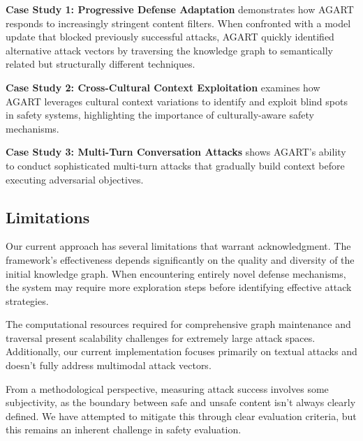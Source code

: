 \textbf{Case Study 1: Progressive Defense Adaptation} demonstrates how AGART responds to increasingly stringent content filters. When confronted with a model update that blocked previously successful attacks, AGART quickly identified alternative attack vectors by traversing the knowledge graph to semantically related but structurally different techniques.

\textbf{Case Study 2: Cross-Cultural Context Exploitation} examines how AGART leverages cultural context variations to identify and exploit blind spots in safety systems, highlighting the importance of culturally-aware safety mechanisms.

\textbf{Case Study 3: Multi-Turn Conversation Attacks} shows AGART's ability to conduct sophisticated multi-turn attacks that gradually build context before executing adversarial objectives.

\subsection{Limitations}
Our current approach has several limitations that warrant acknowledgment. The framework's effectiveness depends significantly on the quality and diversity of the initial knowledge graph. When encountering entirely novel defense mechanisms, the system may require more exploration steps before identifying effective attack strategies.

The computational resources required for comprehensive graph maintenance and traversal present scalability challenges for extremely large attack spaces. Additionally, our current implementation focuses primarily on textual attacks and doesn't fully address multimodal attack vectors.

From a methodological perspective, measuring attack success involves some subjectivity, as the boundary between safe and unsafe content isn't always clearly defined. We have attempted to mitigate this through clear evaluation criteria, but this remains an inherent challenge in safety evaluation.
